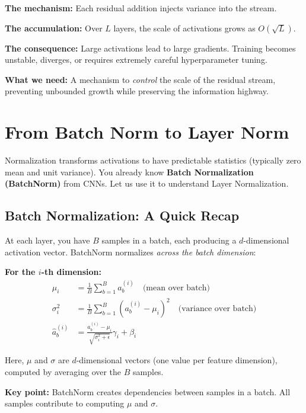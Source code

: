 \documentclass{article}
\begin{document}
\begin{tcolorbox}[colback=red!5!white, colframe=red!75!black, title=The Scale Drift Problem]
\textbf{The mechanism:} Each residual addition injects variance into the stream.

\textbf{The accumulation:} Over $L$ layers, the scale of activations grows as $O(\sqrt{L})$.

\textbf{The consequence:} Large activations lead to large gradients. Training becomes unstable, diverges, or requires extremely careful hyperparameter tuning.

\textbf{What we need:} A mechanism to \textit{control} the scale of the residual stream, preventing unbounded growth while preserving the information highway.
\end{tcolorbox}

\section{From Batch Norm to Layer Norm}

Normalization transforms activations to have predictable statistics (typically zero mean and unit variance). You already know \textbf{Batch Normalization (BatchNorm)} from CNNs. Let us use it to understand Layer Normalization.

\subsection{Batch Normalization: A Quick Recap}

At each layer, you have $B$ samples in a batch, each producing a $d$-dimensional activation vector. BatchNorm normalizes \textit{across the batch dimension}:

\textbf{For the $i$-th dimension:}
\begin{align}
\mu_i &= \frac{1}{B} \sum_{b=1}^B a_b^{(i)} \quad \text{(mean over batch)} \\
\sigma_i^2 &= \frac{1}{B} \sum_{b=1}^B (a_b^{(i)} - \mu_i)^2 \quad \text{(variance over batch)} \\
\hat{a}_b^{(i)} &= \frac{a_b^{(i)} - \mu_i}{\sqrt{\sigma_i^2 + \epsilon}} \gamma_i + \beta_i
\end{align}

Here, $\mu$ and $\sigma$ are $d$-dimensional vectors (one value per feature dimension), computed by averaging over the $B$ samples.

\textbf{Key point:} BatchNorm creates dependencies between samples in a batch. All samples contribute to computing $\mu$ and $\sigma$.
\end{document}
